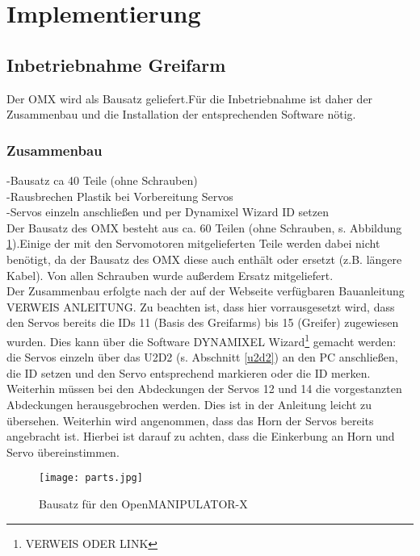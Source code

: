 \section{Implementierung}

\subsection {Inbetriebnahme Greifarm}
Der OMX wird als Bausatz geliefert.Für die Inbetriebnahme ist daher der Zusammenbau und die Installation der entsprechenden Software  nötig. 
\subsubsection{Zusammenbau}
-Bausatz ca 40 Teile (ohne Schrauben)\\
-Rausbrechen Plastik bei Vorbereitung Servos\\
-Servos einzeln anschließen und per Dynamixel Wizard ID setzen\\
Der Bausatz des OMX besteht aus ca. 60 Teilen (ohne Schrauben, s. Abbildung \ref{fig:omxparts}).Einige der mit den Servomotoren mitgelieferten Teile werden dabei nicht benötigt, da der Bausatz des OMX diese auch enthält oder ersetzt (z.B. längere Kabel). Von allen Schrauben wurde außerdem Ersatz mitgeliefert.\\
Der Zusammenbau erfolgte nach der auf der Webseite verfügbaren Bauanleitung VERWEIS ANLEITUNG. Zu beachten ist, dass hier vorrausgesetzt wird, dass den Servos bereits die IDs 11 (Basis des Greifarms) bis 15 (Greifer) zugewiesen wurden. Dies kann über die Software DYNAMIXEL Wizard{\footnote{VERWEIS ODER LINK}} gemacht werden: die Servos einzeln über das U2D2 (s. Abschnitt {\ref{u2d2}}) an den PC anschließen, die ID setzen und den Servo entsprechend markieren oder die ID merken. Weiterhin müssen bei den Abdeckungen der Servos 12 und 14 die vorgestanzten Abdeckungen herausgebrochen werden. Dies ist in der Anleitung leicht zu übersehen. Weiterhin wird angenommen, dass das Horn der Servos bereits angebracht ist. Hierbei ist darauf zu achten, dass die Einkerbung an Horn und Servo übereinstimmen.
\begin{figure}[ht!]
\centering
\texttt{[image: parts.jpg]}
\caption{Bausatz für den OpenMANIPULATOR-X}
\label{fig:omxparts}
\end{figure}
